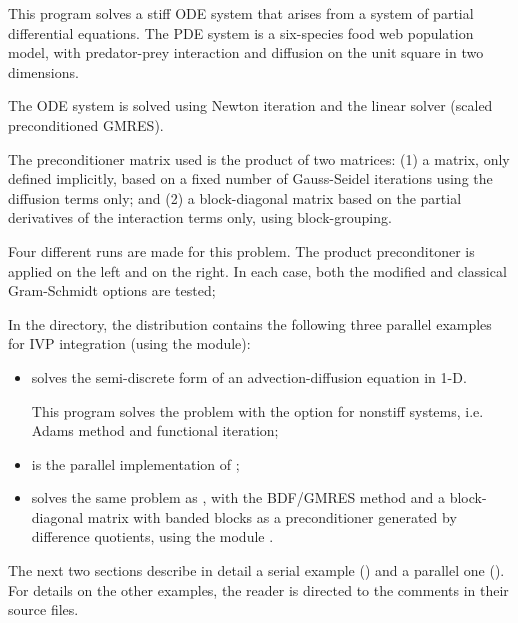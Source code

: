 \begin{itemize}
  This program solves a stiff ODE system that arises from a system     
  of partial differential equations.  The PDE system is a six-species
  food web population model, with predator-prey interaction and diffusion 
  on the unit square in two dimensions.

  The ODE system is solved using Newton iteration and the      
  {\cvspgmr} linear solver (scaled preconditioned GMRES).                  
                                                                        
  The preconditioner matrix used is the product of two matrices:         
  (1) a matrix, only defined implicitly, based on a fixed number of     
  Gauss-Seidel iterations using the diffusion terms only; and               
  (2) a block-diagonal matrix based on the partial derivatives of the   
  interaction terms only, using block-grouping.                          
                                                                        
  Four different runs are made for this problem.                        
  The product preconditoner is applied on the left and on the right.    
  In each case, both the modified and classical Gram-Schmidt options    
  are tested;
\end{itemize}

\noindent In the  directory, the {\cvode} 
distribution contains the following three parallel examples for
IVP integration (using the {\nvecp} module):
\begin{itemize}
\item {}
  solves the semi-discrete form of an advection-diffusion equation in 1-D.

  This program solves the problem with the option for nonstiff systems,
  i.e. Adams method and functional iteration;
\item {}
  is the parallel implementation of ;
\item {}
  solves the same problem as , with the BDF/GMRES method 
  and a block-diagonal matrix with banded blocks as a preconditioner 
  generated by difference quotients, using the module {\cvbbdpre}.
\end{itemize}

The next two sections describe in detail a serial example () and
a parallel one (). For details on the other examples, the reader is
directed to the comments in their source files.


